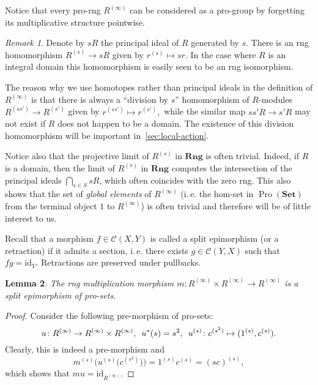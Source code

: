 \documentclass[oneside, 11pt]{amsart}
\numberwithin{equation}{section}
\newtheorem{lemma}{Lemma} \numberwithin{lemma}{section}
\theoremstyle{definition}
\theoremstyle{remark}
\newtheorem{rem}[lemma]{Remark}
\DeclareMathOperator{\Pro}{Pro}
\newcommand{\Set}{\mathbf{Set}}
\newcommand{\Rng}{\mathbf{Rng}}
\begin{document}
Notice that every pro-rng $R^{(\infty)}$ can be considered as a pro-group by forgetting its multiplicative structure pointwise.

\begin{rem}\label{rem:prorings-comment}
 Denote by $sR$ the principal ideal of $R$ generated by $s$. 
 There is an rng homomorphism $R^{(s)} \to sR$ given by $r^{(s)}\mapsto sr$.
 In the case where $R$ is an integral domain this homomorphism is easily seen to be an rng isomorphism. 
 
 The reason why we use homotopes rather than principal ideals in the definition of $R^{(\infty)}$ is that
 there is always a ``division by $s$'' homomorphism of $R$-modules $R^{(ss')} \to R^{(s')}$ given by $r^{(ss')} \mapsto r^{(s')},$
 while the similar map $ss'R \to s'R$ may not exist if $R$ does not happen to be a domain.
 The existence of this division homomorphism will be important in~\cref{sec:local-action}.
 
 Notice also that the projective limit of $R^{(s)}$ in $\Rng$ is often trivial.
 Indeed, if $R$ is a domain, then the limit of $R^{(s)}$ in $\Rng$ computes the intersection of the principal ideals $\bigcap_{s\in S} sR$, which often coincides with the zero rng. 
 This also shows that the set of {\it global elements} of $R^{(\infty)}$ (i.\,e. the hom-set in $\Pro(\Set)$ from the terminal object $1$ to $R^{(\infty)}$) is often trivial and therefore will be of little interest to us.
\end{rem}

Recall that a morphism \(f \in \mathcal C(X, Y)\) is called a split epimorphism (or a retraction) if it admits a section,
 i.\,e. there exists $g \in \mathcal{C}(Y, X)$ such that $fg = \mathrm{id}_{Y}$. Retractions are preserved under pullbacks.

\begin{lemma}\label{RingGeneration}
The rng multiplication morphism $m \colon R^{(\infty)} \times R^{(\infty)} \to R^{(\infty)}$ is a split epimorphism of pro-sets.
\end{lemma}
\begin{proof}
Consider the following pre-morphism of pro-sets:
\[u \colon R^{(\infty)} \to R^{(\infty)} \times R^{(\infty)}, \enskip u^*(s) = s^2, \enskip u^{(s)} \colon c^{(s^2)} \mapsto (1^{(s)}, c^{(s)}).\]
Clearly, this is indeed a pre-morphism and
\[m^{(s)}\bigl(u^{(s)}\bigl(c^{(s^2)}\bigr)\bigr) = 1^{(s)} c^{(s)} = (sc)^{(s)},\]
which shows that $mu = \mathrm{id}_{R^{(\infty)}}$.
\end{proof}
\end{document}
